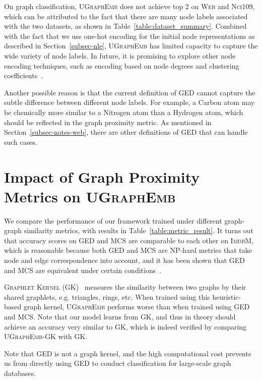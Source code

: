 \documentclass{article}
\newcommand{\model}{\textsc{UGraphEmb}\xspace}
\newcommand{\imdb}{\textsc{ImdbM}\xspace}
\newcommand{\web}{\textsc{Web}\xspace}
\newcommand{\nci}{\textsc{Nci109}\xspace}
\begin{document}
On graph classification, \model does not achieve top 2 on \web and \nci, which can be attributed to the fact that there are many node labels associated with the two datasets, as shown in Table~\ref{table:dataset_summary}. Combined with the fact that we use one-hot encoding for the initial node representations as described in Section~\ref{subsec-nle}, \model has limited capacity to capture the wide variety of node labels. In future, it is promising to explore other node encoding techniques, such as encoding based on node degrees and clustering coefficients~\cite{ying2018hierarchical}.

Another possible reason is that the current definition of GED cannot capture the subtle difference between different node labels. For example, a Carbon atom may be chemically more similar to a Nitrogen atom than a Hydrogen atom, which should be reflected in the graph proximity metric. As mentioned in Section~\ref{subsec-notes-web}, there are other definitions of GED that can handle such cases.




 \section{Impact of Graph Proximity Metrics on \model}

We compare the performance of our framework trained under different graph-graph similarity metrics, with results in Table~\ref{table:metric_result}. It turns out that accuracy scores on GED and MCS are comparable to each other on \imdb, which is reasonable because both GED and MCS are NP-hard metrics that take node and edge correspondence into account, and it has been shown that GED and MCS are equivalent under certain conditions~\cite{bunke1997relation}. 


\textsc{Graphlet Kernel} (\textsc{GK})~\cite{shervashidze2009efficient} measures the similarity between two graphs by their shared graphlets, e.g. triangles, rings, etc. When trained using this heuristic-based graph kernel, \model performs worse than when trained using GED and MCS. Note that our model learns from \textsc{GK}, and thus in theory should achieve an accuracy very similar to \textsc{GK}, which is indeed verified by comparing \model-\textsc{GK} with \textsc{GK}. 


Note that GED is not a graph kernel, and the high computational cost prevents us from directly using GED to conduct classification for large-scale graph databases. 
\end{document}
